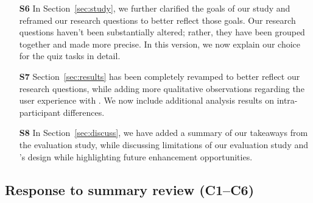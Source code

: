 \begin{itemize}
\item[\textbf{S6}]
In Section~\ref{sec:study}, 
we further clarified the goals of our study
and reframed our research questions to 
better reflect those goals. 
Our research questions haven't been substantially altered;
rather, they have been grouped together and made more precise. 
In this version,
we now explain our choice
for the quiz tasks in detail. 
\item[\textbf{S7}] Section~\ref{sec:results} has been completely
revamped to better reflect our research questions,
while adding more qualitative observations 
regarding the user experience with \noah. 
We now
include additional analysis results on intra-participant differences. 
\item[\textbf{S8}] In Section~\ref{sec:discuss}, we have added a summary of our takeaways from the evaluation study, while discussing limitations of our evaluation study and \noah's design while highlighting future enhancement opportunities. 
\end{itemize}

\subsection*{Response to summary review (C1--C6)}


